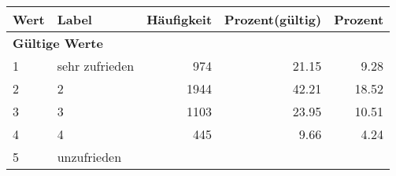      \begin{longtable}{lXrrr}
     \toprule
     \textbf{Wert} & \textbf{Label} & \textbf{Häufigkeit} & \textbf{Prozent(gültig)} & \textbf{Prozent} \\
     \endhead
     \midrule
     \multicolumn{5}{l}{\textbf{Gültige Werte}}\\

     1 &
     \multicolumn{1}{X}{ sehr zufrieden   } &


       \num{974} &
       \num[round-mode=places,round-precision=2]{21.15} &
         \num[round-mode=places,round-precision=2]{9.28} \\

     2 &
     \multicolumn{1}{X}{ 2   } &


       \num{1944} &
       \num[round-mode=places,round-precision=2]{42.21} &
         \num[round-mode=places,round-precision=2]{18.52} \\

     3 &
     \multicolumn{1}{X}{ 3   } &


       \num{1103} &
       \num[round-mode=places,round-precision=2]{23.95} &
         \num[round-mode=places,round-precision=2]{10.51} \\

     4 &
     \multicolumn{1}{X}{ 4   } &


       \num{445} &
       \num[round-mode=places,round-precision=2]{9.66} &
         \num[round-mode=places,round-precision=2]{4.24} \\

     5 &
     \multicolumn{1}{X}{ unzufrieden   } &



\end{longtable}
